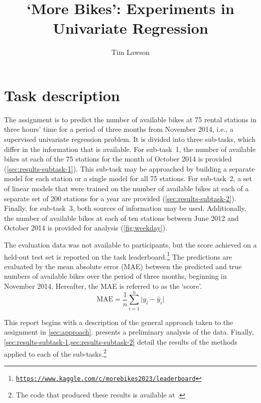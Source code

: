 \documentclass[11pt]{extarticle}
\newcommand{\kaggle}{https://www.kaggle.com/c/morebikes2023/leaderboard}
\begin{document}
\title{`More Bikes': Experiments in Univariate Regression}
\author[]{Tim Lawson}
\date{}

\maketitle

\section{Task description}

The assignment is to predict the number of available bikes at 75 rental stations in
three hours' time for a period of three months from November 2014, i.e., a supervised
univariate regression problem.
It is divided into three sub-tasks, which differ in the information that is available.
For sub-task~1, the number of available bikes at each of the 75 stations for the month
of October 2014 is provided (\cref{sec:results-subtask-1}).
This sub-task may be approached by building a separate model for each station or a
single model for all 75 stations.
For sub-task~2, a set of linear models that were trained on the number of available
bikes at each of a separate set of 200 stations for a year are provided
(\cref{sec:results-subtask-2}).
Finally, for sub-task~3, both sources of information may be used.
Additionally, the number of available bikes at each of ten stations between June 2012
and October 2014 is provided for analysis (\cref{fig:weekday}).

The evaluation data was not available to participants, but the score achieved on a
held-out test set is reported on the task
leaderboard.\footnote{\href{\kaggle}{\texttt{\kaggle}}} The predictions are evaluated
by the mean absolute error (MAE) between the predicted and true numbers of available
bikes over the period of three months, beginning in November 2014.
Hereafter, the MAE is referred to as the `score'.
\begin{equation}
  \label{eq:mae}
  \text{MAE} = \frac{1}{n} \sum_{i = 1}^n \lvert y_i - \hat{y}_i \rvert
\end{equation}

This report begins with a description of the general approach taken to the assignment
in \cref{sec:approach}.
 presents a preliminary analysis of the data.
Finally, \cref{sec:results-subtask-1,sec:results-subtask-2} detail the results of the
methods applied to each of the sub-tasks.\footnote{The code that produced these results
  is available at .
}
\end{document}
